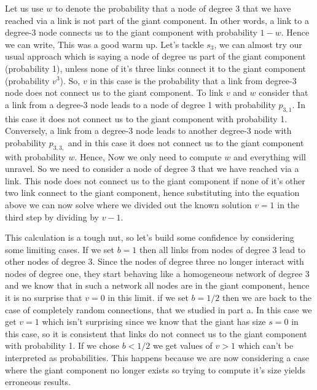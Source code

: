  Let us use $w$ to denote the probability that a node of degree 3 that we have reached via a link is not part of the giant component. In other words, a link to a degree-3 node connects us to the giant component with probability $1-w$. Hence we can write,
 This was a good warm up. Let's tackle $s_3$, we can almost try our usual approach
 which is saying a node of degree us part of the giant component (probability 1), unless none of it's three links connect it to the giant component (probability $v^3$). So, $v$ in this case is the probability that a link from degree-3 node does not connect us to the giant component. To link $v$ and $w$ consider that a link from a degree-3 node leads to a node of degree 1 with probability $p_{3,1}$. In this case it does not connect us to the giant component with probability 1. Conversely, a link from a degree-3 node leads to another degree-3 node with probability $p_{3,3,}$ and in this case it does not connect us to the giant component with probability $w$. Hence,
 Now we only need to compute $w$ and everything will unravel. So we need to consider a node of degree 3 that we have reached via a link. This node does not connect us to the giant component if none of it's other two link connect to the giant component, hence
 substituting into the equation above we can now solve
 where we divided out the known solution $v=1$ in the third step by dividing by $v-1$.
 
 This calculation is a tough nut, so let's build some confidence by considering some limiting cases. If we set $b=1$ then all links from nodes of degree 3 lead to other nodes of degree 3. Since the nodes of degree three no longer interact with nodes of degree one, they start behaving like a homogeneous network of degree 3 and we know that in such a network all nodes are in the giant component, hence it is no surprise that $v=0$ in this limit. if we set $b=1/2$ then we are back to the case of completely random connections, that we studied in part a. In this case we get $v=1$ which isn't surprising since we know that the giant has size $s=0$ in this case, so it is consistent that links do not connect us to the giant component with probability 1. If we chose $b<1/2$ we get values of $v>1$ which can't be interpreted as probabilities. This happens because we are now considering a case where the giant component no longer exists so trying to compute it's size yields erroneous results.     
 
